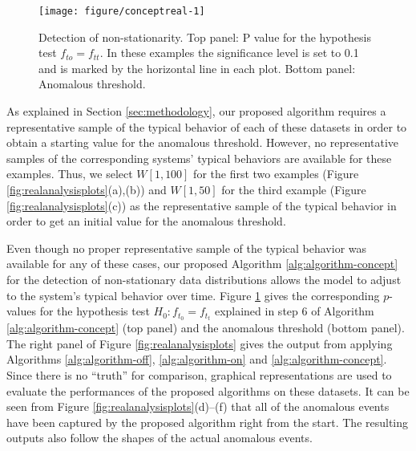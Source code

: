 \documentclass[12pt]{article}
\begin{document}
\begin{figure}[ht]

{\centering \texttt{[image: figure/conceptreal-1]} 

}

\caption{Detection of non-stationarity. Top panel: P value for the hypothesis test $f_{to} = f_{tt}$. In these examples the significance level is set to 0.1 and is marked by the horizontal line in each plot. Bottom panel: Anomalous threshold.}\label{fig:conceptreal}
\end{figure}

As explained in Section \ref{sec:methodology}, our proposed algorithm
requires a representative sample of the typical behavior of each of
these datasets in order to obtain a starting value for the anomalous
threshold. However, no representative samples of the corresponding
systems' typical behaviors are available for these examples. Thus, we
select \(W[1, 100]\) for the first two examples (Figure
\ref{fig:realanalysisplots}(a),(b)) and \(W[1, 50]\) for the third
example (Figure \ref{fig:realanalysisplots}(c)) as the representative
sample of the typical behavior in order to get an initial value for the
anomalous threshold.

Even though no proper representative sample of the typical behavior was
available for any of these cases, our proposed Algorithm
\ref{alg:algorithm-concept} for the detection of non-stationary data
distributions allows the model to adjust to the system's typical
behavior over time. Figure \ref{fig:conceptreal} gives the corresponding
\(p\)-values for the hypothesis test \(H_{0}: f_{t_{0}} = f_{t_{t}}\)
explained in step 6 of Algorithm \ref{alg:algorithm-concept} (top panel)
and the anomalous threshold (bottom panel). The right panel of Figure
\ref{fig:realanalysisplots} gives the output from applying Algorithms
\ref{alg:algorithm-off}, \ref{alg:algorithm-on} and
\ref{alg:algorithm-concept}. Since there is no ``truth'' for comparison,
graphical representations are used to evaluate the performances of the
proposed algorithms on these datasets. It can be seen from Figure
\ref{fig:realanalysisplots}(d)--(f) that all of the anomalous events
have been captured by the proposed algorithm right from the start. The
resulting outputs also follow the shapes of the actual anomalous events.
\end{document}
